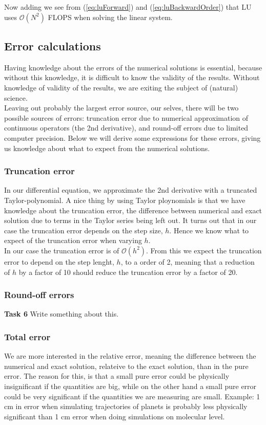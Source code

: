 \documentclass{article}
\begin{document}
Now adding we see from (\ref{eq:luForward}) and (\ref{eq:luBackwardOrder}) that LU uses $\mathcal{O}(N^2)$ FLOPS when solving the linear system.

\subsection{Error calculations}
Having knowledge about the errors of the numerical solutions is essential, because without this knowledge, it is difficult to know the validity of the results. Without knowledge of validity of the results, we are exiting the subject of (natural) science. \\

Leaving out probably the largest error source, our selves, there will be two possible sources of errors: truncation error due to numerical approximation of continuous operators (the 2nd derivative), and round-off errors due to limited computer precision. Below we will derive some expressions for these errors, giving us knowledge about what to expect from the numerical solutions.

\subsubsection{Truncation error}

In our differential equation, we approximate the 2nd derivative with a truncated Taylor-polynomial. A nice thing by using Taylor ploynomials is that we have knowledge about the truncation error, the difference between numerical and exact solution due to terms in the Taylor series being left out. It turns out that in our case the truncation error depends on the step size, $h$. Hence we know what to expect of the truncation error when varying $h$. \\

In our case the truncation error is of $\mathcal{O}(h^2)$. From this we expect the truncation error to depend on the step lenght, $h$, to a order of 2, meaning that a reduction of $h$ by a factor of 10 should reduce the truncation error by a factor of 20.

\subsubsection{Round-off errors}
\textbf{Task 6} Write something about this.

\subsubsection{Total error}
We are more interested in the relative error, meaning the difference between the numerical and exact solution, relateive to the exact solution, than in the pure error. The reason for this, is that a small pure error could be physically insignificant if the quantities are big, while on the other hand a small pure error could be very significant if the quantities we are measuring are small. Example: 1 cm in error when simulating trajectories of planets is probably less physically significant than 1 cm error when doing simulations on molecular level.\\
\end{document}
